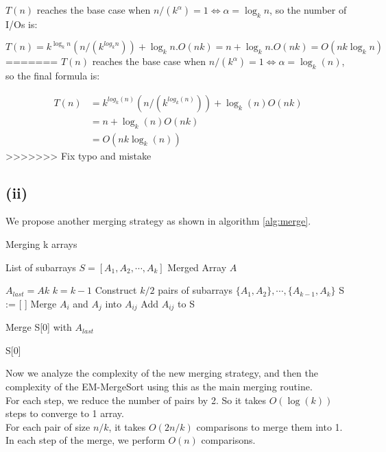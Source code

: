 $T(n)$ reaches the base case when $n/(k^\alpha) = 1 \iff \alpha = \log_k n$, so the number of I/Os is:

$$T(n) = k^{\log_k n} (n/(k^{log_k n})) + \log_k n.O(nk) = n + \log_k n.O(nk) = O(nk\log_k n)$$
=======
$T(n)$ reaches the base case when $n/(k^\alpha) = 1 \iff \alpha = \log_k(n)$, so the final formula is:

\begin{align*}
    T(n) &= k^{log_k(n)} (n/(k^{log_k(n)})) + \log_k(n)O(nk) \\
    &= n + \log_k(n)O(nk)\\
    &= O(nk\log_k(n))
\end{align*}
>>>>>>> Fix typo and mistake

\subsection*{(ii)}
We propose another merging strategy as shown in algorithm \ref{alg:merge}.

\begin{algorithm}[h]
  \caption{Merging k arrays}
  \label{alg:merge}
  \begin{algorithmic}
      \Require List of subarrays $S = [A_1, A_2, \cdots, A_k]$
    \Ensure Merged Array $A$

  \State $A_{last} = A{k}$
  \State $k = k - 1$
  \EndIf
  \State Construct $k/2$ pairs of subarrays $\{A_1, A_2\},\cdots, \{A_{k - 1}, A_k\}$
  \State S := [\,\,]
  \State Merge $A_i$ and $A_j$ into $A_{ij}$
  \State Add $A_{ij}$ to S
  \EndFor
  \EndWhile

  \State Merge S[0] with $A_{last}$
  \EndIf

  \Return S[0]
\end{algorithmic}
\end{algorithm}

Now we analyze the complexity of the new merging strategy, and then the complexity of the EM-MergeSort using this as the main merging routine. \\

For each step, we reduce the number of pairs by 2. So it takes $O(\log(k))$ steps to converge to 1 array.\\ 

For each pair of size $n/k$, it takes $O(2n/k)$ comparisons to merge them into 1. In each step of the merge, we perform $O(n)$ comparisons.\\

